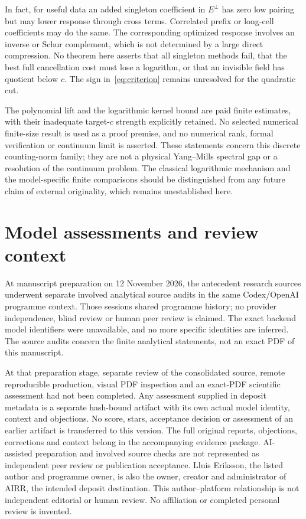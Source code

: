 \documentclass[11pt]{article}
\theoremstyle{definition}
\theoremstyle{remark}
\begin{document}
In fact, for useful data an added singleton coefficient in $E^\perp$ has
zero low pairing but may lower response through cross terms. Correlated
prefix or long-cell coefficients may do the same. The corresponding
optimized response involves an inverse or Schur complement, which is not
determined by a large direct compression. No theorem here asserts that
all singleton methods fail, that the best full cancellation cost must
lose a logarithm, or that an invisible field has quotient below $c$.
The sign in~\eqref{eq:criterion} remains unresolved for the quadratic cut.

The polynomial lift and the logarithmic kernel bound are paid finite
estimates, with their inadequate target-$c$ strength explicitly retained.
No selected numerical finite-size result is used as a proof premise, and
no numerical rank, formal verification or continuum limit is asserted.
These statements concern this discrete counting-norm family; they are not
a physical Yang--Mills spectral gap or a resolution of the continuum
problem. The classical logarithmic mechanism and the model-specific
finite comparisons should be distinguished from any future claim of
external originality, which remains unestablished here.

\section*{Model assessments and review context}
At manuscript preparation on 12 November 2026, the
antecedent research sources underwent separate involved analytical source
audits in the same Codex/OpenAI programme context. Those sessions shared
programme history; no provider independence, blind review or human peer
review is claimed. The exact backend model identifiers were unavailable,
and no more specific identities are inferred. The source audits concern
the finite analytical statements, not an exact PDF of this manuscript.

At that preparation stage, separate review of the consolidated source,
remote reproducible production, visual PDF inspection and an exact-PDF
scientific assessment had not been completed. Any assessment supplied in
deposit metadata is a separate hash-bound artifact with its own actual
model identity, context and objections. No score, stars, acceptance
decision or assessment of an earlier artifact is transferred to this
version. The full original reports, objections, corrections and context
belong in the accompanying evidence package. AI-assisted preparation and
involved source checks are not represented as independent peer review or
publication acceptance. Lluis Eriksson, the listed author and programme
owner, is also the owner, creator and administrator of AIRR, the intended
deposit destination. This author--platform relationship is not independent
editorial or human review. No affiliation or completed personal review is
invented.
\end{document}
